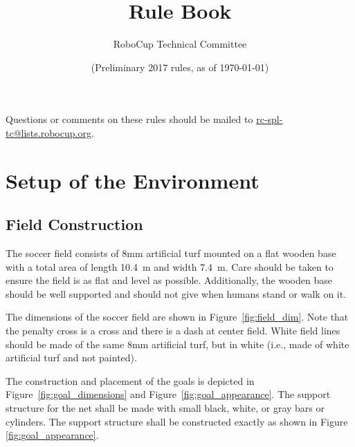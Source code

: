 \documentclass[12pt]{article}
\title{\leaguename Rule Book}
\author{RoboCup Technical Committee}
\date{(Preliminary 2017 rules, as of \today)}
\newcommand{\TotalWidth}{7.4~m\xspace}
\newcommand{\TotalLength}{10.4~m\xspace }
\begin{document}
\maketitle

\begin{center}
Questions or comments on these rules should be mailed to \url{rc-spl-tc@lists.robocup.org}.
\end{center}

\vfill

\tableofcontents
\setcounter{tocdepth}{3}

\thispagestyle{fancy}

\clearpage

\cfoot{\thepage}
\setcounter{page}{1}

\newpage

\section{Setup of the Environment}

\subsection{Field Construction}
\label{sec:field_dim}

The soccer field consists of 8mm artificial turf mounted on a flat wooden base with a total area of length \TotalLength and width \TotalWidth.  Care should be taken to ensure the field is as flat and level as possible.  Additionally, the wooden base should be well supported and should not give when humans stand or walk on it.

The dimensions of the soccer field are shown in Figure~\ref{fig:field_dim}. Note that the penalty cross is a cross and there is a dash at center field. White field lines should be made of the same 8mm artificial turf, but in white (i.e., made of white artificial turf and not painted).

The construction and placement of the goals is depicted in Figure~\ref{fig:goal_dimensions} and Figure~\ref{fig:goal_appearance}. The support structure for the net shall be made with small black, white, or gray bars or cylinders.  The support structure shall be constructed exactly as shown in Figure \ref{fig:goal_appearance}.
\end{document}
